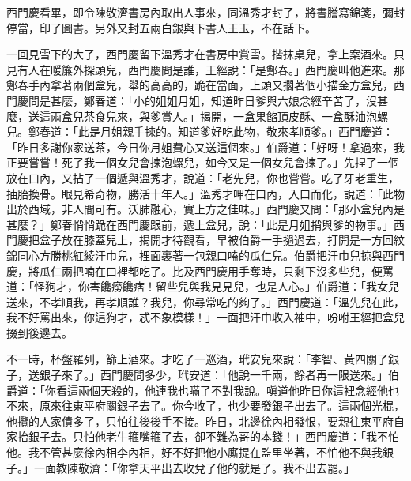 西門慶看畢，即令陳敬濟書房內取出人事來，同溫秀才封了，將書謄寫錦箋，彌封停當，印了圖書。另外又封五兩白銀與下書人王玉，不在話下。

一回見雪下的大了，西門慶留下溫秀才在書房中賞雪。揩抹桌兒，拿上案酒來。只見有人在暖簾外探頭兒，西門慶問是誰，王經說：「是鄭春。」西門慶叫他進來。那鄭春手內拿著兩個盒兒，舉的高高的，跪在當面，上頭又擱著個小描金方盒兒，西門慶問是甚麼，鄭春道：「小的姐姐月姐，知道昨日爹與六娘念經辛苦了，沒甚麼，送這兩盒兒茶食兒來，與爹賞人。」揭開，一盒果餡頂皮酥、一盒酥油泡螺兒。鄭春道：「此是月姐親手揀的。知道爹好吃此物，敬來孝順爹。」西門慶道：「昨日多謝你家送茶，今日你月姐費心又送這個來。」伯爵道：「好呀！拿過來，我正要嘗嘗！死了我一個女兒會揀泡螺兒，如今又是一個女兒會揀了。」先捏了一個放在口內，又拈了一個遞與溫秀才，說道：「老先兒，你也嘗嘗。吃了牙老重生，抽胎換骨。眼見希奇物，勝活十年人。」溫秀才呷在口內，入口而化，說道：「此物出於西域，非人間可有。沃肺融心，實上方之佳味。」西門慶又問：「那小盒兒內是甚麼？」鄭春悄悄跪在西門慶跟前，遞上盒兒，說：「此是月姐捎與爹的物事。」西門慶把盒子放在膝蓋兒上，揭開才待觀看，早被伯爵一手撾過去，打開是一方回紋錦同心方勝桃紅綾汗巾兒，裡面裹著一包親口嗑的瓜仁兒。伯爵把汗巾兒掠與西門慶，將瓜仁兩把喃在口裡都吃了。比及西門慶用手奪時，只剩下沒多些兒，便罵道：「怪狗才，你害饞癆饞痞！留些兒與我見見兒，也是人心。」伯爵道：「我女兒送來，不孝順我，再孝順誰？我兒，你尋常吃的夠了。」西門慶道：「溫先兒在此，我不好罵出來，你這狗才，忒不象模樣！」一面把汗巾收入袖中，吩咐王經把盒兒掇到後邊去。

不一時，杯盤羅列，篩上酒來。才吃了一巡酒，玳安兒來說：「李智、黃四關了銀子，送銀子來了。」西門慶問多少，玳安道：「他說一千兩，餘者再一限送來。」伯爵道：「你看這兩個天殺的，他連我也瞞了不對我說。嗔道他昨日你這裡念經他也不來，原來往東平府關銀子去了。你今收了，也少要發銀子出去了。這兩個光棍，他攬的人家債多了，只怕往後後手不接。昨日，北邊徐內相發恨，要親往東平府自家抬銀子去。只怕他老牛箍嘴箍了去，卻不難為哥的本錢！」西門慶道：「我不怕他。我不管甚麼徐內相李內相，好不好把他小廝提在監里坐著，不怕他不與我銀子。」一面教陳敬濟：「你拿天平出去收兌了他的就是了。我不出去罷。」

